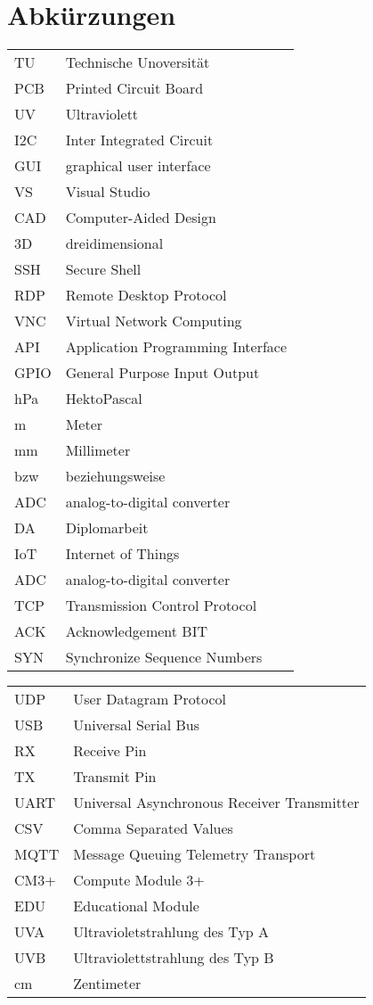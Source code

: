 \section{Abkürzungen}

\begin{tabular}{l l}
TU & Technische Unoversität\\
PCB &  Printed Circuit Board \\
UV & Ultraviolett \\
I2C & Inter Integrated Circuit \\
GUI & graphical user interface \\
VS & Visual Studio \\
CAD & Computer-Aided Design\\
3D & dreidimensional\\
SSH & Secure Shell\\
RDP & Remote Desktop Protocol \\
VNC & Virtual Network Computing \\
API & Application Programming Interface\\
GPIO & General Purpose Input Output\\
hPa & HektoPascal\\
m & Meter\\
mm & Millimeter\\
bzw & beziehungsweise\\
ADC & analog-to-digital converter\\
DA & Diplomarbeit\\
IoT&Internet of Things\\
ADC & analog-to-digital converter\\
TCP & Transmission Control Protocol\\
ACK & Acknowledgement BIT\\
SYN & Synchronize Sequence Numbers\\
\end{tabular}
\newpage
\begin{tabular}{l l}
UDP & User Datagram Protocol\\
USB & Universal Serial Bus\\
RX & Receive Pin\\
TX & Transmit Pin \\
UART & Universal Asynchronous Receiver Transmitter\\
CSV & Comma Separated Values\\
MQTT & Message Queuing Telemetry Transport\\
CM3+ & Compute Module 3+\\
EDU & Educational Module\\
UVA & Ultravioletstrahlung des Typ A \\
UVB & Ultraviolettstrahlung des Typ B\\
cm & Zentimeter\\
\end{tabular}